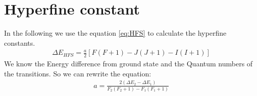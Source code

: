 \section{Hyperfine constant}
In the following we use the equation \ref{eq:HFS} to calculate the hyperfine constants.
\begin{align}
    \label{eq:HFS}
    \Delta E_{HFS} = \frac{a}{2} [F(F+1) - J(J+1) - I(I+1)]
\end{align}
We know the Energy difference from ground state and the Quantum numbers of the transitions. So we can rewrite the equation: 
\begin{align}
    a = \frac{2(\Delta E_2 - \Delta E_1)}{F_2(F_2+1)-F_1(F_1+1)}
\end{align}